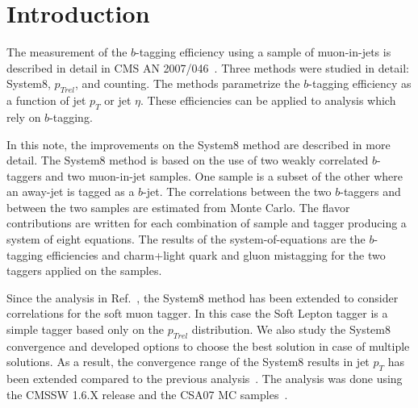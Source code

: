 \section{Introduction}

The measurement of the $b$-tagging efficiency using a sample of muon-in-jets is described
in detail in CMS AN 2007/046~\cite{ref:btag_oldnote}. Three methods were
studied in detail: System8, $p_{Trel}$,
and counting. The methods parametrize the $b$-tagging efficiency  
as a function of jet $p_T$ or jet $\eta$. These efficiencies can be applied to analysis which
rely on $b$-tagging.

In this note, the improvements on the System8 method are described in more detail. The System8 method is based on the use of two weakly correlated
$b$-taggers and two muon-in-jet samples. One sample is a subset of the
other where an away-jet is tagged as a $b$-jet. The correlations
between the two $b$-taggers and between the two samples are estimated
from Monte Carlo. The flavor contributions are written for 
each combination of sample and tagger producing a system of eight
equations. The results of the system-of-equations are the
$b$-tagging efficiencies and charm+light quark and gluon mistagging 
for the two taggers applied on the samples. 

Since the analysis in Ref.~\cite{ref:btag_oldnote}, the System8 method has been extended to consider correlations for the soft
muon tagger. In this case the Soft Lepton tagger is a simple tagger based only on the $p_{Trel}$
distribution. We also study the System8 convergence and developed options to choose the best
solution in case of multiple solutions. As a result, the convergence range of the System8 results in jet $p_T$ has been extended compared to the previous 
analysis~\cite{ref:btag_oldnote}. The analysis was done using the CMSSW 1.6.X 
release and the CSA07 MC samples~\cite{ref:csa07}.
 
